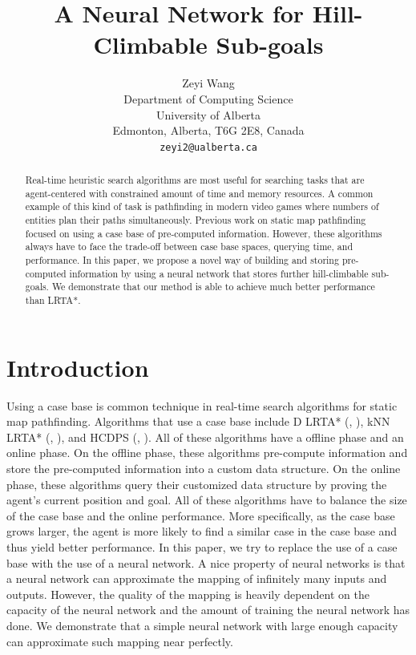 \documentclass[letterpaper]{article}
\title{A Neural Network for Hill-Climbable Sub-goals}
\author{Zeyi Wang \\
    Department of Computing Science \\ University of Alberta \\
    Edmonton, Alberta, T6G 2E8, Canada \\
    {\texttt{zeyi2@ualberta.ca} }}
\newcommand{\citea}[1]{(\citeauthor{#1}, \citeyear{#1})}
\numberwithin{equation}{section}
\numberwithin{theorem}{section}
\numberwithin{lemma}{section}
\numberwithin{df}{section}
\begin{document}
    \maketitle

    \begin{abstract}
        Real-time heuristic search algorithms are most useful for searching tasks that are agent-centered with constrained amount of time and memory resources.
        A common example of this kind of task is pathfinding in modern video games where numbers of entities plan their paths simultaneously.
        Previous work on static map pathfinding focused on using a case base of pre-computed information.
        However, these algorithms always have to face the trade-off between case base spaces, querying time, and performance.
        In this paper, we propose a novel way of building and storing pre-computed information by using a neural network that stores further hill-climbable sub-goals.
        We demonstrate that our method is able to achieve much better performance than LRTA*.

    \end{abstract}


    \section{Introduction}\label{sec:introduction}
    Using a case base is common technique in real-time search algorithms for static map pathfinding.
    Algorithms that use a case base include D LRTA* \citea{dlrta}, kNN LRTA* \citea{knnlrta}, and HCDPS \citea{hcdps}.
    All of these algorithms have a offline phase and an online phase.
    On the offline phase, these algorithms pre-compute information and store the pre-computed information into a custom data structure.
    On the online phase, these algorithms query their customized data structure by proving the agent's current position and goal.
    All of these algorithms have to balance the size of the case base and the online performance.
    More specifically, as the case base grows larger, the agent is more likely to find a similar case in the case base and thus yield better performance.
    In this paper, we try to replace the use of a case base with the use of a neural network.
    A nice property of neural networks is that a neural network can approximate the mapping of infinitely many inputs and outputs.
    However, the quality of the mapping is heavily dependent on the capacity of the neural network and the amount of training the neural network has done.
    We demonstrate that a simple neural network with large enough capacity can approximate such mapping near perfectly.
\end{document}
